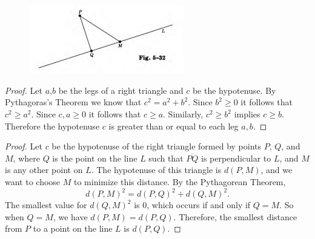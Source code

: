 \begin{figure}[h]
    \centering
    \includegraphics[width=0.6\textwidth]{images/5_12.png}
\end{figure}

\begin{proof}
    Let $a$,$b$ be the legs of a right triangle and $c$ be the hypotenuse.
    By Pythagoras's Theorem we know that $c^2 = a^2 + b^2$.
    Since $b^2 \ge 0$ it follows that $c^2 \ge a^2$.
    Since $c, a \ge 0$ it follows that $c \ge a$.
    Similarly, $c^2 \ge b^2$ implies $c \ge b$.  
    Therefore the hypotenuse $c$ is greater than or equal to each leg $a, b$.
\end{proof}

\begin{proof}
    Let $c$ be the hypotenuse of the right triangle formed by points $P$, $Q$, and $M$, 
    where $Q$ is the point on the line $L$ such that $\overline{PQ}$ is perpendicular to $L$, 
    and $M$ is any other point on $L$.  
    The hypotenuse of this triangle is $d(P, M)$, and we want to choose $M$ to minimize this distance.  
    By the Pythagorean Theorem,  
    \[
        d(P, M)^2 = d(P, Q)^2 + d(Q, M)^2.
    \]
    The smallest value for $d(Q, M)^2$ is $0$, which occurs if and only if $Q = M$.  
    So when $Q = M$, we have $d(P, M) = d(P, Q)$.  
    Therefore, the smallest distance from $P$ to a point on the line $L$ is $d(P, Q)$.
\end{proof}

